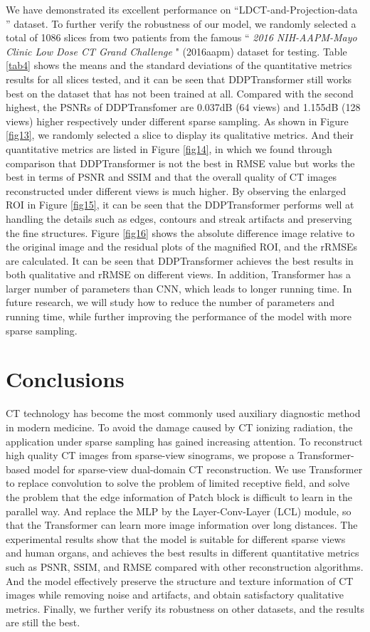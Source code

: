 \documentclass[lettersize,journal]{IEEEtran}
\begin{document}
We have demonstrated its excellent performance on ``LDCT-and-Projection-data '' dataset. To further verify the robustness of our model, we randomly selected a total of 1086 slices from two patients from the famous `` \emph{2016 NIH-AAPM-Mayo Clinic Low Dose CT Grand Challenge} " (2016aapm)\cite{mccollough2016tu} dataset for testing. Table \ref{tab4} shows the means and the standard deviations of the quantitative metrics results for all slices tested, and it can be seen that DDPTransformer still works best on the dataset that has not been trained at all. Compared with the second highest, the PSNRs of DDPTransfomer are 0.037dB (64 views) and 1.155dB (128 views) higher respectively under different sparse sampling.  As shown in Figure \ref{fig13}, we randomly selected a slice to display its qualitative metrics. And their quantitative metrics are listed in Figure \ref{fig14}, in which we found through comparison that DDPTransformer is not the best in RMSE value but works the best in terms of PSNR and SSIM and that the overall quality of CT images reconstructed under different views is much higher. By observing the enlarged ROI in Figure \ref{fig15}, it can be seen that the DDPTransformer performs well at handling the details such as edges, contours and streak artifacts and preserving the fine structures. Figure \ref{fig16} shows the absolute difference image relative to the original image and the residual plots of the magnified ROI, and the rRMSEs are calculated. It can be seen that DDPTransformer achieves the best results in both qualitative and rRMSE on different views. In addition, Transformer has a larger number of parameters than CNN, which leads to longer running time. In future research, we will study how to reduce the number of parameters and running time, while further improving the performance of the model with more sparse sampling.

\section{Conclusions}

CT technology has become the most commonly used auxiliary diagnostic method in modern medicine. To avoid the damage caused by CT ionizing radiation, the application under sparse sampling has gained increasing attention. To reconstruct high quality CT images from sparse-view sinograms, we propose a Transformer-based model for sparse-view dual-domain CT reconstruction. We use Transformer to replace convolution to solve the problem of limited receptive field, and solve the problem that the edge information of Patch block is difficult to learn in the parallel way. And replace the MLP by the Layer-Conv-Layer (LCL) module, so that the Transformer can learn more image information over long distances. The experimental results show that the model is suitable for different sparse views and human organs, and achieves the best results in different quantitative metrics such as PSNR, SSIM, and RMSE compared with other reconstruction algorithms. And the model effectively preserve the structure and texture information of CT images while removing noise and artifacts, and obtain satisfactory qualitative metrics. Finally, we further verify its robustness on other datasets, and the results are still the best.



\newpage
\end{document}
